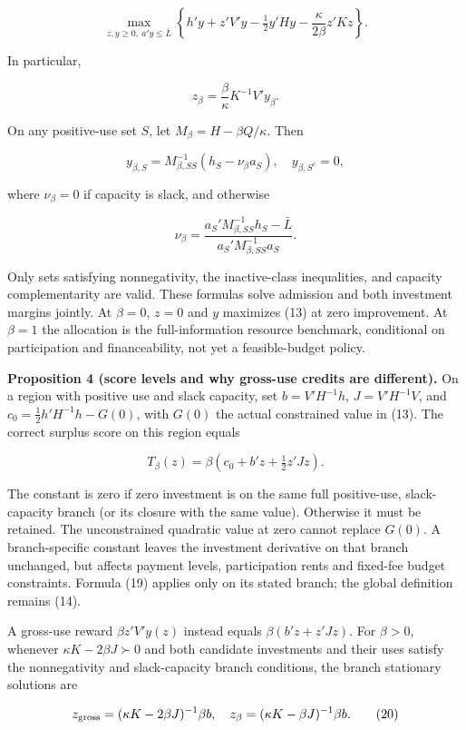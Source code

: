 \documentclass[
  11pt,
]{article}
\begin{document}
\[\max_{z,y\geq0,\ a'y\leq\bar L}
\left\{h'y+z'V'y-\tfrac12y'Hy
-\frac{\kappa}{2\beta}z'Kz\right\}. \tag{15}\]

In particular,

\[z_\beta=\frac\beta\kappa K^{-1}V'y_\beta. \tag{16}\]

On any positive-use set \(S\), let \(M_\beta=H-\beta Q/\kappa\). Then

\[y_{\beta,S}=M_{\beta,SS}^{-1}(h_S-\nu_\beta a_S),\quad y_{\beta,S^c}=0, \tag{17}\]

where \(\nu_\beta=0\) if capacity is slack, and otherwise

\[\nu_\beta=
\frac{a_S'M_{\beta,SS}^{-1}h_S-\bar L}
{a_S'M_{\beta,SS}^{-1}a_S}. \tag{18}\]

Only sets satisfying nonnegativity, the inactive-class inequalities, and
capacity complementarity are valid. These formulas solve admission and
both investment margins jointly. At \(\beta=0\), \(z=0\) and \(y\)
maximizes (13) at zero improvement. At \(\beta=1\) the allocation is the
full-information resource benchmark, conditional on participation and
financeability, not yet a feasible-budget policy.

\textbf{Proposition 4 (score levels and why gross-use credits are
different).} On a region with positive use and slack capacity, set
\(b=V'H^{-1}h\), \(J=V'H^{-1}V\), and \(c_0=\tfrac12h'H^{-1}h-G(0)\),
with \(G(0)\) the actual constrained value in (13). The correct surplus
score on this region equals

\[T_\beta(z)=\beta(c_0+b'z+\tfrac12z'Jz). \tag{19}\]

The constant is zero if zero investment is on the same full
positive-use, slack-capacity branch (or its closure with the same
value). Otherwise it must be retained. The unconstrained quadratic value
at zero cannot replace \(G(0)\). A branch-specific constant leaves the
investment derivative on that branch unchanged, but affects payment
levels, participation rents and fixed-fee budget constraints. Formula
(19) applies only on its stated branch; the global definition remains
(14).

A gross-use reward \(\beta z'V'y(z)\) instead equals
\(\beta(b'z+z'Jz)\). For \(\beta>0\), whenever
\(\kappa K-2\beta J\succ0\) and both candidate investments and their
uses satisfy the nonnegativity and slack-capacity branch conditions, the
branch stationary solutions are

\[z_{\rm gross}=(\kappa K-2\beta J)^{-1}\beta b,
\quad z_\beta=(\kappa K-\beta J)^{-1}\beta b. \tag{20}\]
\end{document}
